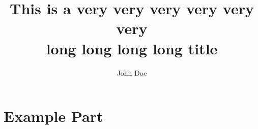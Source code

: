 \documentclass{AjouThesis}
\title{This is a very very very very very very \\ long long long long title}
\author{John Doe}
\begin{document}


\part{Example Part}

\end{document}
